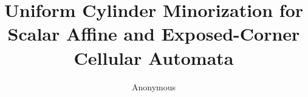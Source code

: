 \documentclass[11pt,reqno]{amsart}
\title[Uniform cylinder minorization]{Uniform Cylinder Minorization for
Scalar Affine and Exposed-Corner Cellular Automata}
\author{Anonymous}
\date{}
\theoremstyle{definition}
\theoremstyle{remark}
\begin{document}
\begin{abstract}

\end{abstract}

\maketitle










\end{document}
